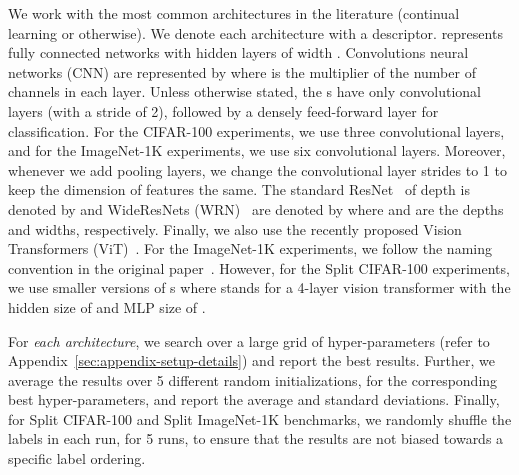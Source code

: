 We work with the most common architectures in the literature (continual learning or otherwise). We denote each architecture with a descriptor. \MLPArch represents fully connected networks with hidden layers of width .
Convolutions neural networks (CNN) are represented by \CNNArch where  is the multiplier of the number of channels in each layer. Unless otherwise stated, the \CNN s have only convolutional layers (with a stride of 2), followed by a densely feed-forward layer for classification. For the CIFAR-100 experiments, we use three convolutional layers, and for the ImageNet-1K experiments, we use six convolutional layers. Moreover, whenever we add pooling layers, we change the convolutional layer strides to 1 to keep the dimension of features the same. The standard ResNet~\citep{he2016deep} of depth  is denoted by \ResNetArch and WideResNets (WRN)~\citep{WRN-ZagoruykoK16} are denoted by \WRNArch where  and  are the depths and widths, respectively. Finally, we also use the recently proposed Vision Transformers (ViT)~\citep{VisionTransformerOriginal}. For the ImageNet-1K experiments, we follow the naming convention in the original paper~\citep{VisionTransformerOriginal}. However, for the Split CIFAR-100 experiments, we use smaller versions of \ViT s where \ViTArch stands for a 4-layer vision transformer with the hidden size of  and MLP size of .

For \emph{each architecture}, we search over a large grid of hyper-parameters (refer to Appendix~\ref{sec:appendix-setup-details}) and report the best results. Further, we average the results over 5 different random initializations, for the corresponding best hyper-parameters, and report the average and standard deviations. Finally, for Split CIFAR-100 and Split ImageNet-1K benchmarks, we randomly shuffle the labels in each run, for 5 runs, to ensure that the results are not biased towards a specific label ordering.


